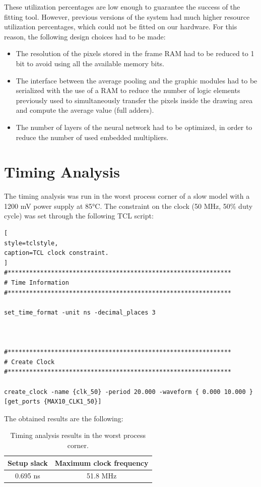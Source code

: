 \documentclass[11pt]{report}
\begin{document}
These utilization percentages are low enough to guarantee the success of the fitting tool. However, previous versions of the system had much higher resource utilization percentages, which could not be fitted on our hardware. For this reason, the following design choices had to be made:
\begin{itemize}
    \item The resolution of the pixels stored in the frame RAM had to be reduced to 1 bit to avoid using all the available memory bits.
    \item The interface between the average pooling and the graphic modules had to be serialized with the use of a RAM to reduce the number of logic elements previously used to simultaneously transfer the pixels inside the drawing area and compute the average value (full adders).
    \item The number of layers of the neural network had to be optimized, in order to reduce the number of used embedded multipliers.
\end{itemize}

\section{Timing Analysis}
The timing analysis was run in the worst process corner of a slow model with a 1200 mV power supply at 85°C. The constraint on the clock (50 MHz, 50\% duty cycle) was set through the following TCL script:

\begin{lstlisting}[
style=tclstyle,
caption=TCL clock constraint.
]
#**************************************************************
# Time Information
#**************************************************************

set_time_format -unit ns -decimal_places 3



#**************************************************************
# Create Clock
#**************************************************************

create_clock -name {clk_50} -period 20.000 -waveform { 0.000 10.000 } [get_ports {MAX10_CLK1_50}]
\end{lstlisting}

The obtained results are the following:

\begin{table}[!h]
\renewcommand{\arraystretch}{1.5}
\centering
\begin{tabular}{|c|c|}
\hline
\textbf{Setup slack} & \textbf{Maximum clock frequency} \\ \hline
0.695 ns             & 51.8 MHz     \\ \hline
\end{tabular}
\caption{Timing analysis results in the worst process corner.}
\label{tab:timing_analysis}
\end{table}
\end{document}
